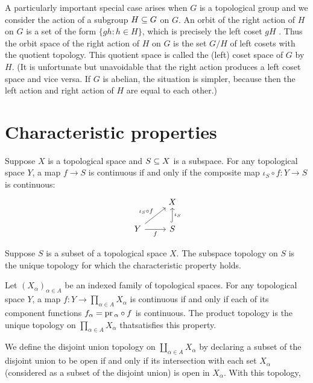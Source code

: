 \vspace{5mm}
A particularly important special case arises when $G$ is a topological group and we consider the action of a subgroup $H\subseteq G$ on $G$. An orbit of the right action of $H$ on $G$ is a set of the form $\{gh:h\in H\}$, which is precisely the left coset $gH$ . Thus the orbit space of the right action of $H$ on $G$ is the set $G/H$ of left cosets with the quotient topology. This quotient space is called the (left) coset space of $G$ by $H$. (It is unfortunate but unavoidable that the right action produces a left coset space and vice versa. If $G$ is abelian, the situation is simpler, because then the left action and right action of $H$ are equal to each other.)
\section{Characteristic properties}
\begin{theorem}
Suppose $X$ is a topological space and $S\subseteq X$ is a subspace. For any topological space $Y$, a
map $f\to S$ is continuous if and only if the composite map $\iota_S\circ f:Y\to S$ is
continuous:
\[\begin{tikzcd}
&X\\
Y\ar[ru,"\iota_S\circ f"]\ar[swap,r,"f"]&S\ar[hook,u,swap,"\iota_S"]
\end{tikzcd}\]
\end{theorem}
\begin{theorem}
Suppose $S$ is a subset of a topological space $X$. The subspace topology on $S$ is the unique topology for which the characteristic property holds.
\end{theorem}
\begin{theorem}
Let $(X_{\alpha})_{\alpha\in A}$ be an indexed family of topological spaces. For any topological space $Y$, a map $f:Y\to \prod_{\alpha\in A}X_{\alpha}$ is continuous if and only if each of its component functions $f_{\alpha}=\mathrm{pr}\,_{\alpha}\circ f$ is continuous. The product topology is the unique topology on $\prod_{\alpha\in A}X_{\alpha}$ thatsatisfies this property.
\end{theorem}
We define the disjoint union topology on $\coprod_{\alpha\in A}X_{\alpha}$ by declaring a subset of the disjoint union to be open if and only if its intersection with each set $X_{\alpha}$ (considered as a subset of the disjoint union) is open in $X_{\alpha}$. With this topology,
